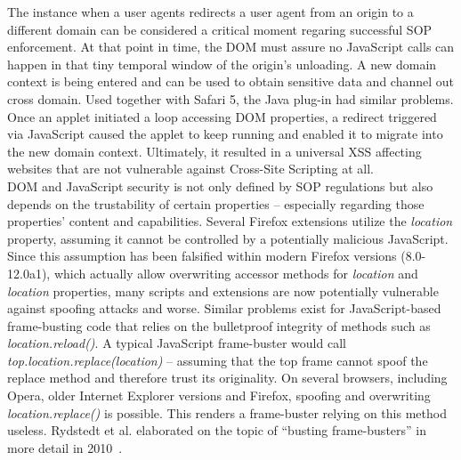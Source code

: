       The instance when a user agents redirects a user agent from an origin to a different domain can be considered a critical moment regaring successful SOP enforcement. At that point in time, the DOM must assure no JavaScript calls can happen in that tiny temporal window of the origin's unloading. A new domain context is being entered and can be used to obtain sensitive data and channel out cross domain. Used together with Safari 5, the Java plug-in had similar problems. Once an applet initiated a loop accessing DOM properties, a redirect triggered via JavaScript caused the applet to keep running and enabled it to migrate into the new domain context. Ultimately, it resulted in a universal XSS affecting websites that are not vulnerable against Cross-Site Scripting at all.\\

      DOM and JavaScript security is not only defined by SOP regulations but also depends on the trustability of certain properties -- especially regarding those properties' content and capabilities.  Several Firefox extensions utilize the \textit{location} property, assuming it cannot be controlled by a potentially malicious JavaScript. Since this assumption has been falsified within modern Firefox versions (8.0-12.0a1), which actually allow overwriting accessor methods for \textit{location} and \textit{location} properties, many scripts and extensions are now potentially vulnerable against spoofing attacks and worse. Similar problems exist for JavaScript-based frame-busting code that relies on the bulletproof integrity of methods such as \textit{location.reload()}. A typical JavaScript frame-buster would call \textit{top.location.replace(location)} -- assuming that the top frame cannot spoof the replace method and therefore trust its originality. On several browsers, including Opera, older Internet 
Explorer versions and Firefox, spoofing and overwriting \textit{location.replace()} is possible. This renders a frame-buster relying on this method useless. Rydstedt et al. elaborated on the topic of ``busting frame-busters'' in more detail in 2010~\cite{rydstedt_busting_2010}.\\

